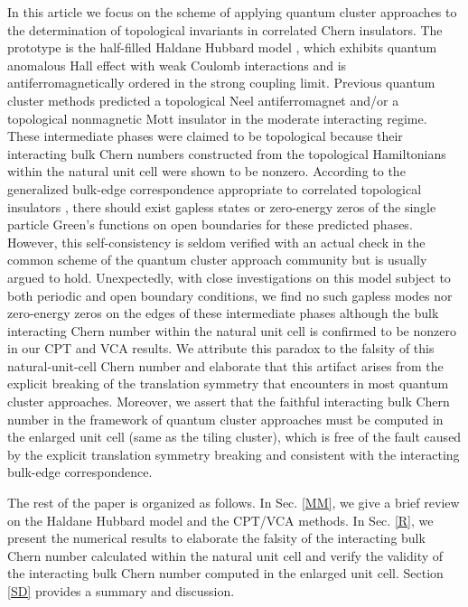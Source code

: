 \documentclass[12pt]{iopart}
\begin{document}
\par In this article we focus on the scheme of applying quantum cluster approaches to the determination of topological invariants in correlated Chern insulators. The prototype is the half-filled Haldane Hubbard model \cite{HZKL_PRB2011-1,HZKL_PRB2011-2,MR_PRB2013,HRP_PRB2015,ZSWZ_PRB2015,HCPP_PRL2016,VSLTHT_PRL2016,IWT_PRB2016,ASHP_PRB2016,GJMP_PRB2016,GR_NJP2018,LTTNNH_PBCM2018}, which exhibits quantum anomalous Hall effect with weak Coulomb interactions and is antiferromagnetically ordered in the strong coupling limit. Previous quantum cluster methods \cite{WFSM_PRB2016} predicted a topological Neel antiferromagnet and/or a topological nonmagnetic Mott insulator in the moderate interacting regime. These intermediate phases were claimed to be topological because their interacting bulk Chern numbers constructed from the topological Hamiltonians within the natural unit cell were shown to be nonzero. According to the generalized bulk-edge correspondence appropriate to correlated topological insulators \cite{G_PRB2011,EG_PRB2011}, there should exist gapless states or zero-energy zeros of the single particle Green's functions on open boundaries for these predicted phases. However, this self-consistency is seldom verified with an actual check in the common scheme of the quantum cluster approach community but is usually argued to hold. Unexpectedly, with close investigations on this model subject to both periodic and open boundary conditions, we find no such gapless modes nor zero-energy zeros on the edges of these intermediate phases although the bulk interacting Chern number within the natural unit cell is confirmed to be nonzero in our CPT and VCA results. We attribute this paradox to the falsity of this natural-unit-cell Chern number and elaborate that this artifact arises from the explicit breaking of the translation symmetry that encounters in most quantum cluster approaches. Moreover, we assert that the faithful interacting bulk Chern number in the framework of quantum cluster approaches must be computed in the enlarged unit cell (same as the tiling cluster), which is free of the fault caused by the explicit translation symmetry breaking and consistent with the interacting bulk-edge correspondence.

\par The rest of the paper is organized as follows. In Sec. \ref{MM}, we give a brief review on the Haldane Hubbard model and the CPT/VCA methods. In Sec. \ref{R}, we present the numerical results to elaborate the falsity of the interacting bulk Chern number calculated within the natural unit cell and verify the validity of the interacting bulk Chern number computed in the enlarged unit cell. Section \ref{SD} provides a summary and discussion.
\end{document}
